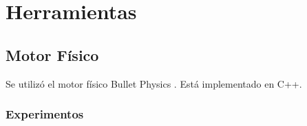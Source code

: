 \documentclass{article}
\begin{document}
\section{Herramientas}

\subsection{Motor F\'isico}

Se utiliz\'o el motor f\'isico Bullet Physics \cite{LinkBullet}. Est\'a implementado en C++.
\subsubsection{Experimentos}

\end{document}
